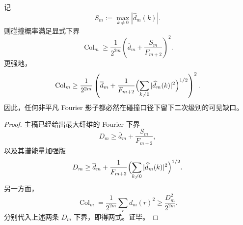 \begin{theorem}\label{thm:conclusion-fourier-shadow-forces-quadratic-collision-gap}
记
\[
S_m:=\max_{k\neq 0}|\widehat d_m(k)|.
\]
则碰撞概率满足显式下界
\[
\operatorname{Col}_m
\ge
\frac{1}{2^{2m}}
\left(
\overline d_m+\frac{S_m}{F_{m+2}}
\right)^2.
\]
更强地，
\[
\operatorname{Col}_m
\ge
\frac{1}{2^{2m}}
\left(
\overline d_m+\frac{1}{F_{m+2}}
\Bigl(\sum_{k\neq0}|\widehat d_m(k)|^2\Bigr)^{1/2}
\right)^2.
\]
因此，任何非平凡 Fourier 影子都必然在碰撞口径下留下二次级别的可见缺口。
\end{theorem}
\begin{proof}
主稿已经给出最大纤维的 Fourier 下界
\[
D_m
\ge
\overline d_m+\frac{S_m}{F_{m+2}},
\]
以及其谱能量加强版
\[
D_m
\ge
\overline d_m+\frac{1}{F_{m+2}}
\Bigl(\sum_{k\neq0}|\widehat d_m(k)|^2\Bigr)^{1/2}.
\]
另一方面，
\[
\operatorname{Col}_m
=
\frac{1}{2^{2m}}\sum_{r}d_m(r)^2
\ge
\frac{D_m^2}{2^{2m}}.
\]
分别代入上述两条 \(D_m\) 下界，即得两式。证毕。
\end{proof}

